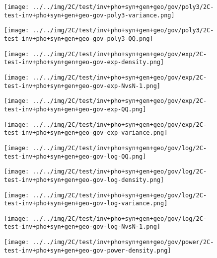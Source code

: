 \begin{figure}[H]
\centering	\texttt{[image: ../../img/2C/test/inv+pho+syn+gen+geo/gov/poly3/2C-test-inv+pho+syn+gen+geo-gov-poly3-variance.png]}
\end{figure}
\begin{figure}[H]
\centering	\texttt{[image: ../../img/2C/test/inv+pho+syn+gen+geo/gov/poly3/2C-test-inv+pho+syn+gen+geo-gov-poly3-QQ.png]}
\end{figure}
\begin{figure}[H]
\centering	\texttt{[image: ../../img/2C/test/inv+pho+syn+gen+geo/gov/exp/2C-test-inv+pho+syn+gen+geo-gov-exp-density.png]}
\end{figure}
\begin{figure}[H]
\centering	\texttt{[image: ../../img/2C/test/inv+pho+syn+gen+geo/gov/exp/2C-test-inv+pho+syn+gen+geo-gov-exp-NvsN-1.png]}
\end{figure}
\begin{figure}[H]
\centering	\texttt{[image: ../../img/2C/test/inv+pho+syn+gen+geo/gov/exp/2C-test-inv+pho+syn+gen+geo-gov-exp-QQ.png]}
\end{figure}
\begin{figure}[H]
\centering	\texttt{[image: ../../img/2C/test/inv+pho+syn+gen+geo/gov/exp/2C-test-inv+pho+syn+gen+geo-gov-exp-variance.png]}
\end{figure}
\begin{figure}[H]
\centering	\texttt{[image: ../../img/2C/test/inv+pho+syn+gen+geo/gov/log/2C-test-inv+pho+syn+gen+geo-gov-log-QQ.png]}
\end{figure}
\begin{figure}[H]
\centering	\texttt{[image: ../../img/2C/test/inv+pho+syn+gen+geo/gov/log/2C-test-inv+pho+syn+gen+geo-gov-log-density.png]}
\end{figure}
\begin{figure}[H]
\centering	\texttt{[image: ../../img/2C/test/inv+pho+syn+gen+geo/gov/log/2C-test-inv+pho+syn+gen+geo-gov-log-variance.png]}
\end{figure}
\begin{figure}[H]
\centering	\texttt{[image: ../../img/2C/test/inv+pho+syn+gen+geo/gov/log/2C-test-inv+pho+syn+gen+geo-gov-log-NvsN-1.png]}
\end{figure}
\begin{figure}[H]
\centering	\texttt{[image: ../../img/2C/test/inv+pho+syn+gen+geo/gov/power/2C-test-inv+pho+syn+gen+geo-gov-power-density.png]}
\end{figure}
